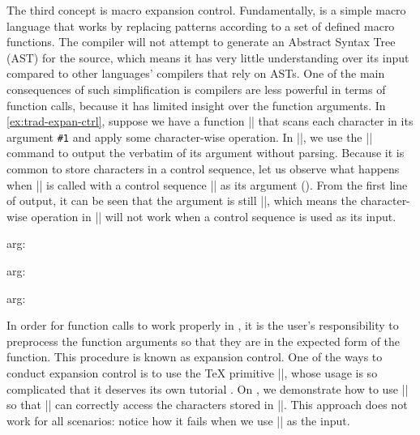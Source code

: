 \documentclass{ltugboat}
\begin{document}
The third concept is macro expansion control.
Fundamentally, \LT{} is a simple macro language that works by replacing patterns according to a set of defined macro functions.
The \LT{} compiler will not attempt to generate an Abstract Syntax Tree (AST) for the \LT{} source, which means it has very little understanding over its input compared to other languages' compilers that rely on ASTs.
One of the main consequences of such simplification is \LT{} compilers are less powerful in terms of function calls, because it has limited insight over the function arguments.
In \cref{ex:trad-expan-ctrl}, suppose we have a function \inltex|\cmda| that scans each character in its argument \verb|#1| and apply some character-wise operation. 
In \inltex|\cmda|, we use the \inltex|\detokenize| command to output the verbatim of its argument without parsing.
Because it is common to store characters in a control sequence, let us observe what happens when \inltex|\cmda| is called with a control sequence \inltex|\vala| as its argument ().
From the first line of output, it can be seen that the argument is still \inltex|\vala|, which means the character-wise operation in \inltex|\cmda| will not work when a control sequence is used as its input.
\begin{latexsample}[examplelabel=ex:trad-expan-ctrl,exampletitle={Expansion Control},noexport]
\def\cmda#1{%
  arg: \detokenize{#1} %
}
\def\vala{val-a}
\def\valb{\vala}
\par\cmda{\vala}
\par\expandafter\expandafter\expandafter\cmda\expandafter{\vala}
\par\expandafter\expandafter\expandafter\cmda\expandafter{\valb}
\end{latexsample}
\noindent In order for function calls to work properly in \LT{}, it is the user's responsibility to preprocess the function arguments so that they are in the expected form of the function.
This procedure is known as expansion control.
One of the ways to conduct expansion control is to use the \TeX{} primitive \inltex|\expandafter|, whose usage is so complicated that it deserves its own tutorial \cite{bechtolsheim1988tutorial}.
On , we demonstrate how to use \inltex|\expandafter| so that \inltex|\cmda| can correctly access the characters stored in \inltex|\vala|.
This approach does not work for all scenarios: notice how it fails when we use \inltex|\valb| as the input.
\end{document}
